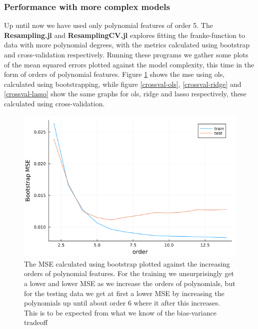 \documentclass{article}
\begin{document}
\subsubsection{Performance with more complex models}
Up until now we have used only polynomial features of order 5. The
\textbf{Resampling.jl} and \textbf{ResamplingCV.jl} explores fitting the
franke-function to data with more polynomial degrees, with the metrics
calculated using bootstrap and cross-validation respectively. Running these
programs we gather some plots of the mean squared errors plotted against the
model complexity, this time in the form of orders of polynomial features. Figure
\ref{bootstrap-bias-var} shows the mse using ols, calculated using
bootstrapping, while figure \ref{crossval-ols}, \ref{crossval-ridge} and
\ref{crossval-lasso} show the same graphs for ols, ridge and lasso respectively,
these calculated using cross-validation.

\begin{figure}
    \includegraphics[scale=0.5]{bootstrapbiasvariance}
    \caption{The MSE calculated using bootstrap plotted against the increasing
        orders of polynomial features. For the training we unsurprisingly get a
        lower and lower MSE as we increase the orders of polynomials, but for the
        testing data we get at first a lower MSE by increasing the polynomials up
        until about order $6$ where it after this increases. This is to be expected
        from what we know of the bias-variance tradeoff}
    \label{bootstrap-bias-var}
\end{figure}
\end{document}
